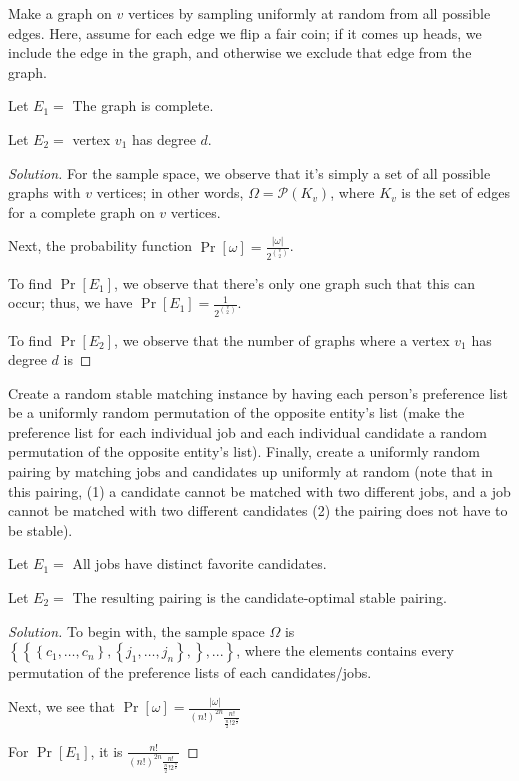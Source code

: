 \documentclass{article}
\newenvironment{solution}{\begin{proof}[Solution]}{\end{proof}}
\begin{document}
\begin{hw}
	Make a graph on $v$ vertices by sampling uniformly at random from all possible edges. Here, assume for each edge we flip a fair coin; if it comes up heads, we include the edge in the graph, and otherwise we exclude that edge from the graph.
	
	Let $E_1 =$ The graph is complete.
	
	Let $E_2 =$ vertex $v_1$ has degree $d$.
\end{hw}
\begin{solution}
	For the sample space, we observe that it's simply a set of all possible graphs with $v$ vertices; in other words, $\Omega = \mathscr{P}(K_{v})$, where $K_{v}$ is the set of edges for a complete graph on $v$ vertices.
	
	Next, the probability function $\Pr[\omega] = \frac{\lvert \omega \rvert}{2^{\binom{v}{2}}}$.
	
	To find $\Pr[E_{1}]$, we observe that there's only one graph such that this can occur; thus, we have $\Pr[E_{1}] = \frac{1}{2^{\binom{v}{2}}}$.
	
	To find $\Pr[E_{2}]$, we observe that the number of graphs where a vertex $v_{1}$ has degree $d$ is 
\end{solution}

\begin{hw}
	Create a random stable matching instance by having each person's
	preference list be a uniformly random permutation of the opposite entity's list (make the preference list for each individual job and each individual candidate a random permutation of the opposite entity's list). Finally, create a uniformly random pairing by matching jobs and candidates up uniformly at random (note that in this pairing, (1) a candidate cannot be matched with two different jobs, and a job cannot be matched with two different candidates (2) the pairing does not have to be stable).
	
	Let $E_1 =$ All jobs have distinct favorite candidates.
	
	Let $E_2 =$ The resulting pairing is the candidate-optimal stable pairing.
\end{hw}
\begin{solution}
	To begin with, the sample space $\Omega$ is $\left\{  \left\{  \left\{  c_{1}, \ldots, c_{n}\right\}, \left\{ j_{1}, \ldots, j_{n} \right\}, \right\}, ... \right\}$, where the elements contains every permutation of the preference lists of each candidates/jobs.
	
	Next, we see that $\Pr[\omega] = \frac{\lvert \omega \rvert}{(n!)^{2n}\frac{n!}{\frac{n}{2}! 2^{\frac{n}{2}}}}$
	
	For $\Pr[E_{1}]$, it is $\frac{n!}{(n!)^{2n}\frac{n!}{\frac{n}{2}! 2^{\frac{n}{2}}}}$
%	
\end{solution}
\end{document}
